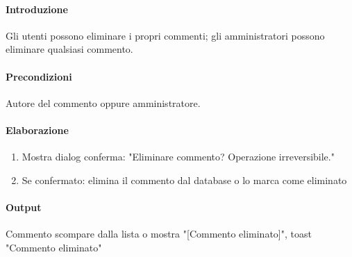 \begin{reqbox}[title=REQ-FUN-19: Elimina Commento]
\label{subsubsec:req-elimina-commento}

\paragraph{Introduzione}
Gli utenti possono eliminare i propri commenti; gli amministratori possono eliminare qualsiasi commento.

\paragraph{Precondizioni}
Autore del commento oppure amministratore.

\paragraph{Elaborazione}
\begin{enumerate}[leftmargin=1.1em]
\item Mostra dialog conferma: "Eliminare commento? Operazione irreversibile."
\item Se confermato: elimina il commento dal database o lo marca come eliminato
\end{enumerate}

\paragraph{Output}
Commento scompare dalla lista o mostra "[Commento eliminato]", toast "Commento eliminato"

\end{reqbox}

\vspace{0.5cm}

\newpage


